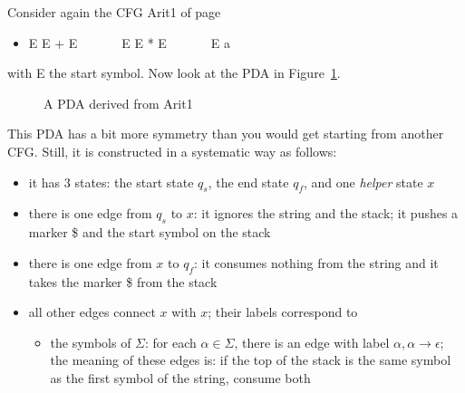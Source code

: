 \begin{vb}
Consider again the CFG Arit1 of page \pageref{arit1label}
\begin{itemize}
\item E \rpijl E + E~~~~~~~E \rpijl E * E~~~~~~~E \rpijl a
\end{itemize}
with E the start symbol. Now look at the PDA in Figure~\ref{pda3}.

\begin{figure}[h]
\caption{A PDA derived from Arit1\label{pda3}}
\end{figure}

This PDA has a bit more symmetry than you would get starting from
another CFG. Still, it is constructed in a systematic way as follows:

%
\begin{itemize}
\item it has 3 states: the start state $q_s$, the end state $q_f$, and
 one {\em helper} state $x$

\item there is one edge from $q_s$ to $x$: it ignores the string and
  the stack; it pushes a marker \$ and the start symbol on the stack

\item there is one edge from $x$ to $q_f$: it consumes nothing from
  the string and it takes the marker \$ from the stack

\item all other edges connect $x$ with $x$; their labels correspond to
\begin{itemize}

\item the symbols of $\Sigma$: for each $\alpha \in \Sigma$, there is
  an edge with label $\alpha,\alpha \rightarrow \epsilon$; the meaning
  of these edges is: if the top of the stack is the same symbol as the
  first symbol of the string, consume both


\end{itemize}
\end{itemize}
\end{vb}

